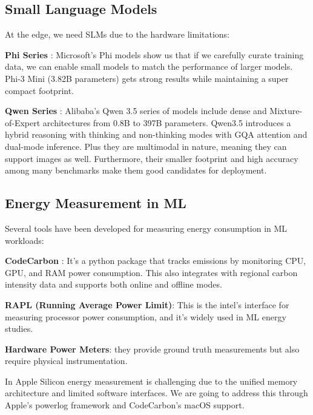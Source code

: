 \documentclass[conference]{IEEEtran}
\begin{document}
\subsection{Small Language Models}

At the edge, we need SLMs due to the hardware limitations:

\textbf{Phi Series} \cite{javaheripi2023phi2, abdin2024phi3}: Microsoft's Phi models show us that if we carefully curate training data, we can enable small models to match the performance of larger models. Phi-3 Mini (3.82B parameters) gets strong results while maintaining a super compact footprint.

\textbf{Qwen Series} \cite{qwen2025technical}: Alibaba's Qwen 3.5 series of models include dense and Mixture-of-Expert architectures from 0.8B to 397B parameters. Qwen3.5 introduces a hybrid reasoning with thinking and non-thinking modes with GQA attention and dual-mode inference. Plus they are multimodal in nature, meaning they can support images as well. Furthermore, their smaller footprint and high accuracy among many benchmarks make them good candidates for deployment.

\subsection{Energy Measurement in ML}

Several tools have been developed for measuring energy consumption in ML workloads:

\textbf{CodeCarbon} \cite{codecarbon2023}: It's a python package that tracks emissions by monitoring CPU, GPU, and RAM power consumption. This also integrates with regional carbon intensity data and supports both online and offline modes.

\textbf{RAPL (Running Average Power Limit)}: This is the intel's interface for measuring processor power consumption, and it's widely used in ML energy studies.

\textbf{Hardware Power Meters}: they provide ground truth measurements but also require physical instrumentation.

In Apple Silicon energy measurement is challenging due to the unified memory architecture and limited software interfaces. We are going to address this through Apple's powerlog framework and CodeCarbon's macOS support.
\end{document}
